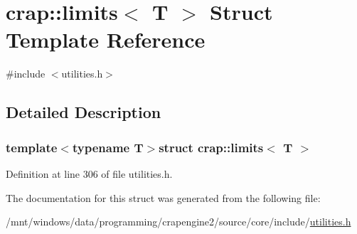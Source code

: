 \hypertarget{structcrap_1_1limits}{}\section{crap\+:\+:limits$<$ T $>$ Struct Template Reference}
\label{structcrap_1_1limits}


{\ttfamily \#include $<$utilities.\+h$>$}



\subsection{Detailed Description}
\subsubsection*{template$<$typename T$>$struct crap\+::limits$<$ T $>$}



Definition at line 306 of file utilities.\+h.



The documentation for this struct was generated from the following file\+:\begin{DoxyCompactItemize}
\item 
/mnt/windows/data/programming/crapengine2/source/core/include/\hyperlink{utilities_8h}{utilities.\+h}\end{DoxyCompactItemize}
